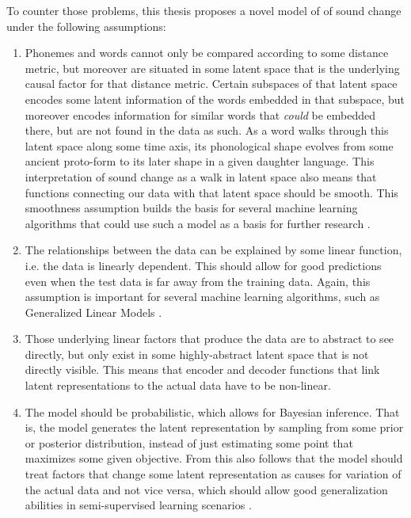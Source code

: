 \documentclass[6pt]{article}
\begin{document}
To counter those problems, this thesis proposes a novel model of of sound change under the following assumptions:
\begin{enumerate}
\item Phonemes and words cannot only be compared according to some distance metric, but moreover are situated in some latent space that is the underlying causal factor for that distance metric. Certain subspaces of that latent space encodes some latent information of the words embedded in that subspace, but moreover encodes information for similar words that \textit{could} be embedded there, but are not found in the data as such. As a word walks through this latent space along some time axis, its phonological shape evolves from some ancient proto-form to its later shape in a given daughter language. This interpretation of sound change as a walk in latent space also means that functions connecting our data with that latent space should be smooth. 
This smoothness assumption builds the basis for several machine learning algorithms that could use such a model as a basis for further research \citep[p. 557]{Goodfellow-et-al-2016-Book}. 
\item The relationships between the data can be explained by some linear function, i.e. the data is linearly dependent. This should allow for good predictions even when the test data is far away from the training data. Again, this assumption is important for several machine learning algorithms, such as Generalized Linear Models \citep[p. 557]{Goodfellow-et-al-2016-Book}.
\item Those underlying linear factors that produce the data are to abstract to see directly, but only exist in some highly-abstract latent space that is not directly visible. This means that encoder and decoder functions that link latent representations to the actual data have to be non-linear.
\item The model should be probabilistic, which allows for Bayesian inference.  That is, the model generates the latent representation by sampling from some prior or posterior distribution, instead of just estimating some point that maximizes some given objective. From this also follows that the model should treat factors that change some latent representation as causes for variation of the actual data and not vice versa, which should allow good generalization abilities in semi-supervised learning scenarios \citep[p. 557]{Goodfellow-et-al-2016-Book}.

\end{enumerate}
\end{document}
